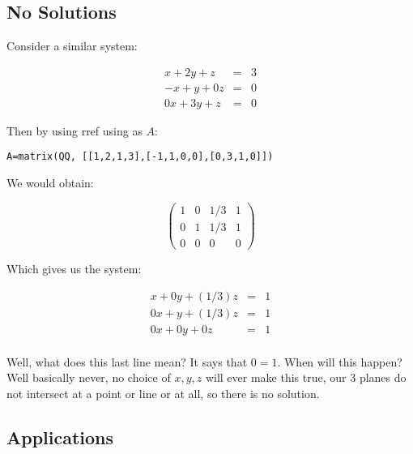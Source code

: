 \subsection{No Solutions}


Consider a similar system:



\begin{eqnarray*}
x+2y+z&=&3\\
-x+y+0z&=&0\\
0x+3y+z&=&0
\end{eqnarray*}

Then by using rref using as $A$:


\begin{verbatim}
A=matrix(QQ, [[1,2,1,3],[-1,1,0,0],[0,3,1,0]])
\end{verbatim}

We would obtain:


$$ \left( \begin{array}{rrr|r}
1 & 0 & 1/3& 1\\
0 & 1 & 1/3 & 1\\
0 & 0 & 0 & 0
\end{array}\right)$$

Which gives us the system:

\begin{eqnarray*}
x+0y+(1/3)z&=&1\\
0x+y+(1/3)z&=&1\\
0x+0y+0z&=&1\\
\end{eqnarray*}


Well, what does this last line mean?  It says that $0=1$.  When will this happen?  Well basically never, no choice of $x,y,z$ will ever make this true, our 3 planes do not intersect at a point or line or at all, so there is no solution.  


\subsection{Applications}

